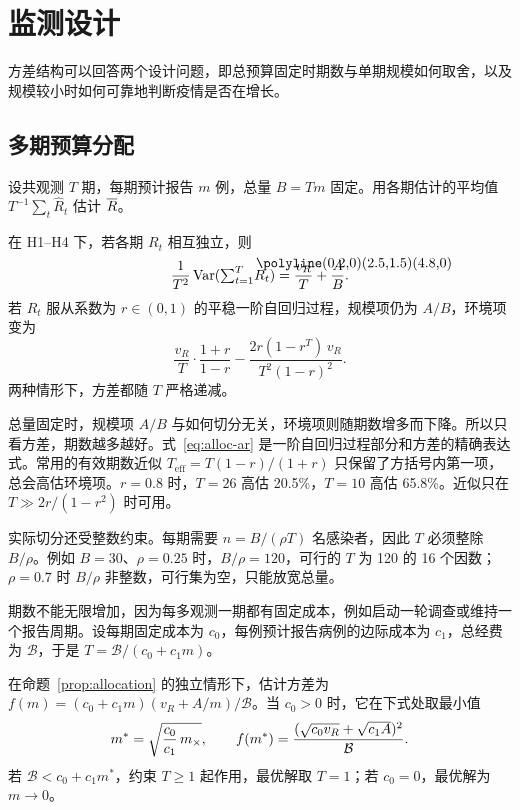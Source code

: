 \section{监测设计}
\label{sec:design}

方差结构可以回答两个设计问题，即总预算固定时期数与单期规模如何取舍，以及规模较小时如何可靠地判断疫情是否在增长。

\subsection{多期预算分配}
\label{sec:design-budget}

设共观测 $T$ 期，每期预计报告 $m$ 例，总量 $B=Tm$ 固定。用各期估计的平均值 $T^{-1}\sum_t\widehat R_t$ 估计 $\overline{R}$。

\begin{proposition}[多期分配]
\label{prop:allocation}
在 H1--H4 下，若各期 $R_t$ 相互独立，则
\begin{equation}
  \frac{1}{T^2}\Var({\textstyle\sum_{t=1}^{T}}\widehat R_t)=\frac{v_R}{T}+\frac{A}{B}.
  \label{eq:alloc-indep}
\end{equation}
若 $R_t$ 服从系数为 $r\in(0,1)$ 的平稳一阶自回归过程，规模项仍为 $A/B$，环境项变为
\begin{equation}
  \frac{v_R}{T}\cdot\frac{1+r}{1-r}-\frac{2r(1-r^T)\,v_R}{T^2(1-r)^2}.
  \label{eq:alloc-ar}
\end{equation}
两种情形下，方差都随 $T$ 严格递减。
\end{proposition}

总量固定时，规模项 $A/B$ 与如何切分无关，环境项则随期数增多而下降。所以只看方差，期数越多越好。式~\eqref{eq:alloc-ar} 是一阶自回归过程部分和方差的精确表达式\citep{hamilton1994time}。常用的有效期数近似 $T_{\mathrm{eff}}=T(1-r)/(1+r)$ 只保留了方括号内第一项，总会高估环境项。$r=0.8$ 时，$T=26$ 高估 20.5\%，$T=10$ 高估 65.8\%。近似只在 $T\gg 2r/(1-r^2)$ 时可用。

实际切分还受整数约束。每期需要 $n=B/(\rho T)$ 名感染者，因此 $T$ 必须整除 $B/\rho$。例如 $B=30$、$\rho=0.25$ 时，$B/\rho=120$，可行的 $T$ 为 120 的 16 个因数；$\rho=0.7$ 时 $B/\rho$ 非整数，可行集为空，只能放宽总量。

期数不能无限增加，因为每多观测一期都有固定成本，例如启动一轮调查或维持一个报告周期。设每期固定成本为 $c_0$，每例预计报告病例的边际成本为 $c_1$，总经费为 $\mathcal B$，于是 $T=\mathcal B/(c_0+c_1m)$。

\begin{corollary}[最优单期规模]
\label{cor:optimal}
在命题~\ref{prop:allocation} 的独立情形下，估计方差为 $f(m)=(c_0+c_1m)(v_R+A/m)/\mathcal B$。当 $c_0>0$ 时，它在下式处取最小值
\begin{equation}
  m^*=\sqrt{\frac{c_0}{c_1}\,m_{\times}},\qquad
  f(m^*)=\frac{(\sqrt{c_0v_R}+\sqrt{c_1A})^2}{\mathcal B}.
  \label{eq:optimal-m}
\end{equation}
若 $\mathcal B<c_0+c_1m^*$，约束 $T\geq1$ 起作用，最优解取 $T=1$；若 $c_0=0$，最优解为 $m\to0$。
\end{corollary}

